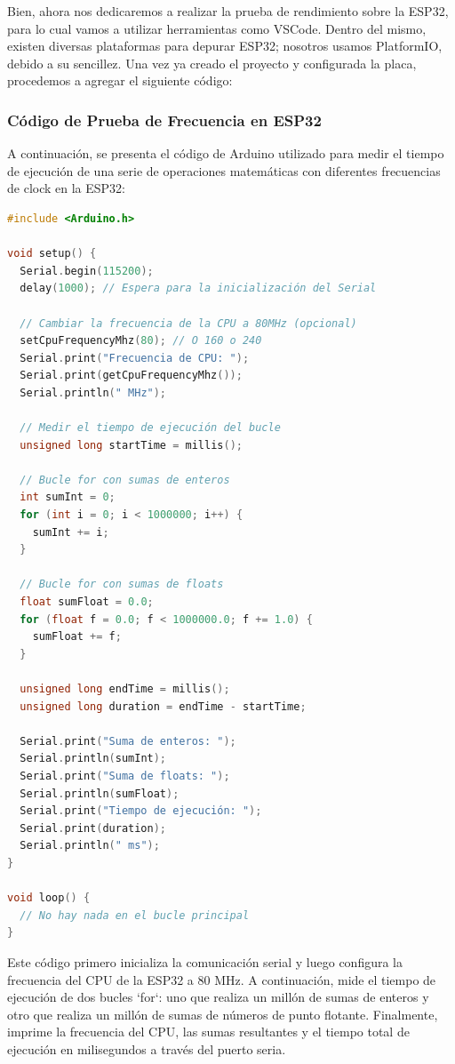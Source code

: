 Bien, ahora nos dedicaremos a realizar la prueba de rendimiento sobre la ESP32, para lo cual vamos a utilizar herramientas como VSCode. Dentro del mismo, existen diversas plataformas para depurar ESP32; nosotros usamos PlatformIO, debido a su sencillez. Una vez ya creado el proyecto y configurada la placa, procedemos a agregar el siguiente código:


\lstset{style=arduino}

\subsubsection*{Código de Prueba de Frecuencia en ESP32}

A continuación, se presenta el código de Arduino utilizado para medir el tiempo de ejecución de una serie de operaciones matemáticas con diferentes frecuencias de clock en la ESP32:

\begin{lstlisting}[language=C++, caption=Código para medir el tiempo de ejecución en ESP32, label=lst:esp32_code]
#include <Arduino.h>

void setup() {
  Serial.begin(115200);
  delay(1000); // Espera para la inicialización del Serial

  // Cambiar la frecuencia de la CPU a 80MHz (opcional)
  setCpuFrequencyMhz(80); // O 160 o 240
  Serial.print("Frecuencia de CPU: ");
  Serial.print(getCpuFrequencyMhz());
  Serial.println(" MHz");

  // Medir el tiempo de ejecución del bucle
  unsigned long startTime = millis();

  // Bucle for con sumas de enteros
  int sumInt = 0;
  for (int i = 0; i < 1000000; i++) {
    sumInt += i;
  }

  // Bucle for con sumas de floats
  float sumFloat = 0.0;
  for (float f = 0.0; f < 1000000.0; f += 1.0) {
    sumFloat += f;
  }

  unsigned long endTime = millis();
  unsigned long duration = endTime - startTime;

  Serial.print("Suma de enteros: ");
  Serial.println(sumInt);
  Serial.print("Suma de floats: ");
  Serial.println(sumFloat);
  Serial.print("Tiempo de ejecución: ");
  Serial.print(duration);
  Serial.println(" ms");
}

void loop() {
  // No hay nada en el bucle principal
}
\end{lstlisting}

Este código primero inicializa la comunicación serial y luego configura la frecuencia del CPU de la ESP32 a 80 MHz. A continuación, mide el tiempo de ejecución de dos bucles `for`: uno que realiza un millón de sumas de enteros y otro que realiza un millón de sumas de números de punto flotante. Finalmente, imprime la frecuencia del CPU, las sumas resultantes y el tiempo total de ejecución en milisegundos a través del puerto seria.



